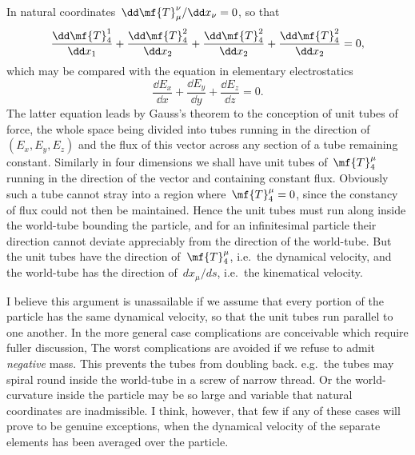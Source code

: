 \documentclass[12pt]{book}
\begin{document}
In natural coordinates~$\dd\mf{T}^\nu_\mu/\dd x_\nu = 0$, so that
\[
\frac{\dd\mf{T}^1_4}{\dd x_1} + \frac{\dd\mf{T}^2_4}{\dd x_2} + \frac{\dd\mf{T}^2_4}{\dd x_2} + \frac{\dd\mf{T}^2_4}{\dd x_2} = 0,
\]
which may be compared with the equation in elementary electrostatics
\[
\frac{\dd E_x}{\dd x} + \frac{\dd E_y}{\dd y} + \frac{\dd E_z}{\dd z} = 0.
\]
The latter equation leads by Gauss's theorem to the conception of unit tubes of force, the whole space being divided
into tubes running in the direction of~$(E_x,E_y,E_z)$ and the flux of this vector across any section of a tube
remaining constant.
Similarly in four dimensions we shall have unit tubes of~$\mf{T}^\mu_4$ running in the direction of the vector and
containing constant flux.
Obviously such a tube cannot stray into a region where~$\mf{T}^\mu_4 = 0$, since the constancy of flux could not
then be maintained.
Hence the unit tubes must run along inside the world-tube bounding the particle, and for an infinitesimal particle
their direction cannot deviate appreciably from the direction of the world-tube.
But the unit tubes have the direction of~$\mf{T}^\mu_4$, i.e.\ the dynamical velocity, and the world-tube has the
direction of~$dx_\mu/ds$, i.e.\ the kinematical velocity.

I believe this argument is unassailable if we assume that every portion of the particle has the same dynamical
velocity, so that the unit tubes run parallel to one another.
In the more general case complications are conceivable which require fuller discussion\footnotemark,\footnotetext
   {The worst complications are avoided if we refuse to admit \emph{negative} mass.
     This prevents the tubes from doubling back.}
e.g.\ the tubes may spiral round inside the world-tube in a screw of narrow thread.
Or the world\hyp{}curvature inside the particle may be so large and variable that natural coordinates are inadmissible.
I think, however, that few if any of these cases will prove to be genuine exceptions, when the dynamical velocity
of the separate elements has been averaged over the particle.

%
%
%
\end{document}

